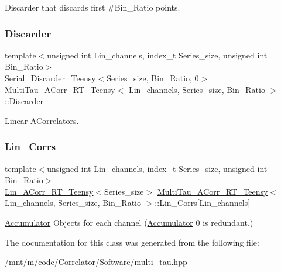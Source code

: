 Discarder that discards first \#\+Bin\+\_\+\+Ratio points. 

\mbox{\label{classMultiTau__ACorr__RT__Teensy_ad216281408b0f32892d3c554ad16309e}} 
\subsubsection{\texorpdfstring{Discarder}{Discarder}}
{\footnotesize\ttfamily template$<$unsigned int Lin\+\_\+channels, index\+\_\+t Series\+\_\+size, unsigned int Bin\+\_\+\+Ratio$>$ \\
Serial\+\_\+\+Discarder\+\_\+\+Teensy$<$Series\+\_\+size, Bin\+\_\+\+Ratio, 0$>$ \hyperlink{classMultiTau__ACorr__RT__Teensy}{Multi\+Tau\+\_\+\+A\+Corr\+\_\+\+R\+T\+\_\+\+Teensy}$<$ Lin\+\_\+channels, Series\+\_\+size, Bin\+\_\+\+Ratio $>$\+::Discarder\hspace{0.3cm}{\ttfamily [private]}}



Linear A\+Correlators. 

\mbox{\label{classMultiTau__ACorr__RT__Teensy_a1dc1e665268e5774e2810b74e6dbebc4}} 
\subsubsection{\texorpdfstring{Lin\+\_\+\+Corrs}{Lin\_Corrs}}
{\footnotesize\ttfamily template$<$unsigned int Lin\+\_\+channels, index\+\_\+t Series\+\_\+size, unsigned int Bin\+\_\+\+Ratio$>$ \\
\hyperlink{classLin__ACorr__RT__Teensy}{Lin\+\_\+\+A\+Corr\+\_\+\+R\+T\+\_\+\+Teensy}$<$Series\+\_\+size$>$ \hyperlink{classMultiTau__ACorr__RT__Teensy}{Multi\+Tau\+\_\+\+A\+Corr\+\_\+\+R\+T\+\_\+\+Teensy}$<$ Lin\+\_\+channels, Series\+\_\+size, Bin\+\_\+\+Ratio $>$\+::Lin\+\_\+\+Corrs\mbox{[}Lin\+\_\+channels\mbox{]}\hspace{0.3cm}{\ttfamily [private]}}



\hyperlink{classAccumulator}{Accumulator} Objects for each channel (\hyperlink{classAccumulator}{Accumulator} \textquotesingle{}0\textquotesingle{} is redundant.) 



The documentation for this class was generated from the following file\+:\begin{DoxyCompactItemize}
\item 
/mnt/m/code/\+Correlator/\+Software/\hyperlink{multi__tau_8hpp}{multi\+\_\+tau.\+hpp}\end{DoxyCompactItemize}
